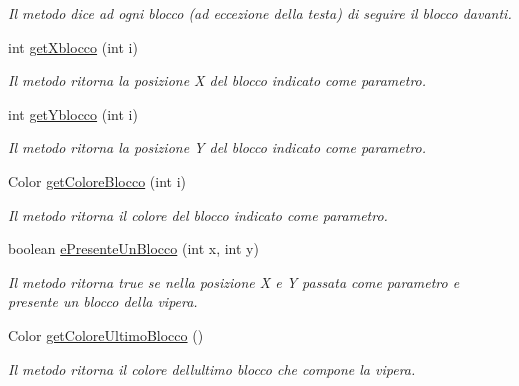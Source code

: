 \begin{DoxyCompactItemize}
\begin{DoxyCompactList}\small\item\em Il metodo dice ad ogni blocco (ad eccezione della testa) di seguire il blocco davanti. \end{DoxyCompactList}\item 
int \mbox{\hyperlink{class_snake_1_1game_1_1vipera_1_1blocchi_ac25c5b310cb26c05d5ea69485d1e155f}{get\+Xblocco}} (int i)
\begin{DoxyCompactList}\small\item\em Il metodo ritorna la posizione X del blocco indicato come parametro. \end{DoxyCompactList}\item 
int \mbox{\hyperlink{class_snake_1_1game_1_1vipera_1_1blocchi_a4fad016a4b1de9e17b7092abd420d962}{get\+Yblocco}} (int i)
\begin{DoxyCompactList}\small\item\em Il metodo ritorna la posizione Y del blocco indicato come parametro. \end{DoxyCompactList}\item 
Color \mbox{\hyperlink{class_snake_1_1game_1_1vipera_1_1blocchi_a6c5d6f8c561308ff9ec579b370a969e0}{get\+Colore\+Blocco}} (int i)
\begin{DoxyCompactList}\small\item\em Il metodo ritorna il colore del blocco indicato come parametro. \end{DoxyCompactList}\item 
boolean \mbox{\hyperlink{class_snake_1_1game_1_1vipera_1_1blocchi_ac24833a417b3bd7c60e29ed5b7edc29f}{e\+Presente\+Un\+Blocco}} (int x, int y)
\begin{DoxyCompactList}\small\item\em Il metodo ritorna true se nella posizione X e Y passata come parametro e\textquotesingle{} presente un blocco della vipera. \end{DoxyCompactList}\item 
Color \mbox{\hyperlink{class_snake_1_1game_1_1vipera_1_1blocchi_a1afbc9b85396f53e6180eab2e5a36d4d}{get\+Colore\+Ultimo\+Blocco}} ()
\begin{DoxyCompactList}\small\item\em Il metodo ritorna il colore dell\textquotesingle{}ultimo blocco che compone la vipera. \end{DoxyCompactList}\end{DoxyCompactItemize}

